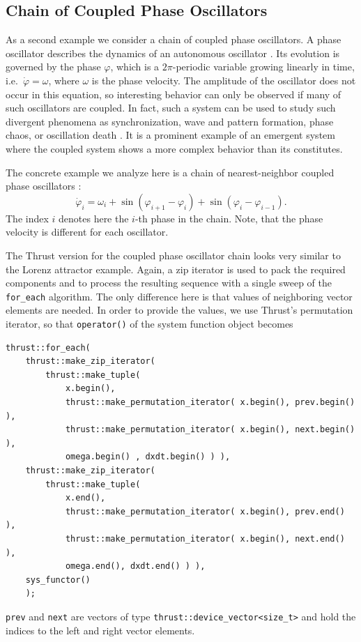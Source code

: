 \documentclass[final]{siamltex}
\newcommand{\code}[1]{\lstinline|#1|}
\begin{document}
%
%
\subsection{Chain of Coupled Phase Oscillators}

As a second example we consider a chain of coupled phase
oscillators. A phase oscillator describes the dynamics of an
autonomous oscillator \cite{PhaseOscillator}. Its evolution is
governed by the phase $\varphi$, which is a $2\pi$-periodic variable growing linearly
in time, i.e.~$\dot{\varphi} = \omega$, where $\omega$ is the phase
velocity. The amplitude of the oscillator does not occur in this
equation, so interesting behavior can only be observed if many
of such oscillators are coupled. In fact, such a system can be used to
study such divergent phenomena as synchronization, wave and pattern
formation, phase chaos, or oscillation death
\cite{Kuramoto-84,Synchronization-Pikovsky}. It is a prominent example
of an emergent system where the coupled system shows a more complex
behavior than its constitutes.



The concrete example we analyze here is a chain of nearest-neighbor
coupled phase oscillators \cite{Cohen-Rand-Holmes-82}:
\begin{equation} \label{eq:phasesystem}
    \dot{\varphi}_i = \omega_i + \sin( \varphi_{i+1} - \varphi_i) + \sin( \varphi_i
    - \varphi_{i-1}).
\end{equation}
The index $i$ denotes here the $i$-th phase in the chain. Note, that
the phase velocity is different for each oscillator.

The Thrust version for the coupled phase oscillator chain looks very similar to
the Lorenz attractor example. Again, a zip iterator is used to pack the required
components and to process the resulting sequence with a single sweep of the
\code{for_each} algorithm. The only difference here is that values of
neighboring vector elements are needed. In order to provide the values, we use Thrust's
permutation iterator, so that \code{operator()} of the system function object becomes
\begin{lstlisting}
thrust::for_each(
    thrust::make_zip_iterator(
        thrust::make_tuple(
            x.begin(),
            thrust::make_permutation_iterator( x.begin(), prev.begin() ),
            thrust::make_permutation_iterator( x.begin(), next.begin() ),
            omega.begin() , dxdt.begin() ) ),
    thrust::make_zip_iterator(
        thrust::make_tuple(
            x.end(),
            thrust::make_permutation_iterator( x.begin(), prev.end() ),
            thrust::make_permutation_iterator( x.begin(), next.end() ),
            omega.end(), dxdt.end() ) ),
    sys_functor()
    );
\end{lstlisting}
\code{prev} and \code{next} are vectors of type
\code{thrust::device_vector<size_t>} and hold the indices to the left and right
vector elements.
\end{document}
